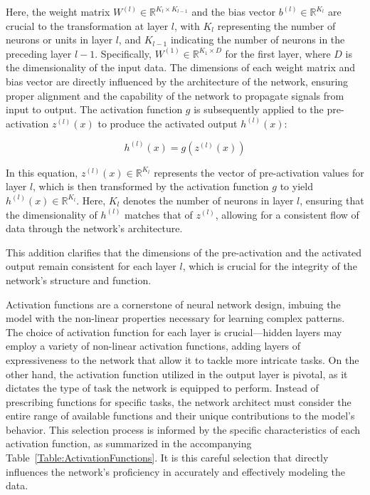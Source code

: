 Here, the weight matrix \( W^{(l)} \in \mathbb{R}^{K_l \times K_{l-1}} \) and the bias vector \( b^{(l)} \in \mathbb{R}^{K_l} \) are crucial to the transformation at layer \( l \), with \( K_l \) representing the number of neurons or units in layer \( l \), and \( K_{l-1} \) indicating the number of neurons in the preceding layer \( l-1 \). Specifically, \( W^{(1)} \in \mathbb{R}^{K_1 \times D} \) for the first layer, where \( D \) is the dimensionality of the input data. The dimensions of each weight matrix and bias vector are directly influenced by the architecture of the network, ensuring proper alignment and the capability of the network to propagate signals from input to output. The activation function \( g \) is subsequently applied to the pre-activation \( z^{(l)}(x) \) to produce the activated output \( h^{(l)}(x) \):

\begin{equation}
h^{(l)}(x) = g(z^{(l)}(x))
\end{equation}

In this equation, \( z^{(l)}(x) \in \mathbb{R}^{K_l} \) represents the vector of pre-activation values for layer \( l \), which is then transformed by the activation function \( g \) to yield \( h^{(l)}(x) \in \mathbb{R}^{K_l} \). Here, \( K_l \) denotes the number of neurons in layer \( l \), ensuring that the dimensionality of \( h^{(l)} \) matches that of \( z^{(l)} \), allowing for a consistent flow of data through the network's architecture.


This addition clarifies that the dimensions of the pre-activation and the activated output remain consistent for each layer \( l \), which is crucial for the integrity of the network's structure and function.

Activation functions are a cornerstone of neural network design, imbuing the model with the non-linear properties necessary for learning complex patterns. The choice of activation function for each layer is crucial—hidden layers may employ a variety of non-linear activation functions, adding layers of expressiveness to the network that allow it to tackle more intricate tasks. On the other hand, the activation function utilized in the output layer is pivotal, as it dictates the type of task the network is equipped to perform. Instead of prescribing functions for specific tasks, the network architect must consider the entire range of available functions and their unique contributions to the model’s behavior. This selection process is informed by the specific characteristics of each activation function, as summarized in the accompanying Table~\ref{Table:ActivationFunctions}. It is this careful selection that directly influences the network's proficiency in accurately and effectively modeling the data.

